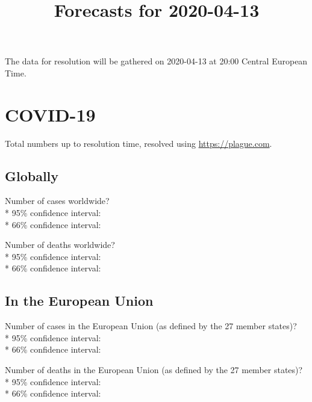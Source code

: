 \documentclass{article}
\title{Forecasts for 2020-04-13}
\begin{document}
\date{\vspace{-7ex}}

\maketitle

The data for resolution will be gathered on 2020-04-13 at 20:00 Central
European Time.

\section*{COVID-19}

Total numbers up to resolution time, resolved using
\href{https://plague.com/}{https://plague.com}.

\subsection*{Globally}

Number of cases worldwide?\\*
95\% confidence interval: \null\hfill\underline{\hspace{8cm}}\\*
66\% confidence interval: \null\hfill\underline{\hspace{8cm}}

\vspace{0.5cm}

Number of deaths worldwide?\\*
95\% confidence interval: \null\hfill\underline{\hspace{8cm}}\\*
66\% confidence interval: \null\hfill\underline{\hspace{8cm}}

\subsection*{In the European Union}

Number of cases in the European Union (as defined by the 27 member
states)?\\*
95\% confidence interval: \null\hfill\underline{\hspace{8cm}}\\*
66\% confidence interval: \null\hfill\underline{\hspace{8cm}}

\vspace{0.5cm}

Number of deaths in the European Union (as defined by the 27 member
states)?\\*
95\% confidence interval: \null\hfill\underline{\hspace{8cm}}\\*
66\% confidence interval: \null\hfill\underline{\hspace{8cm}}
\end{document}
